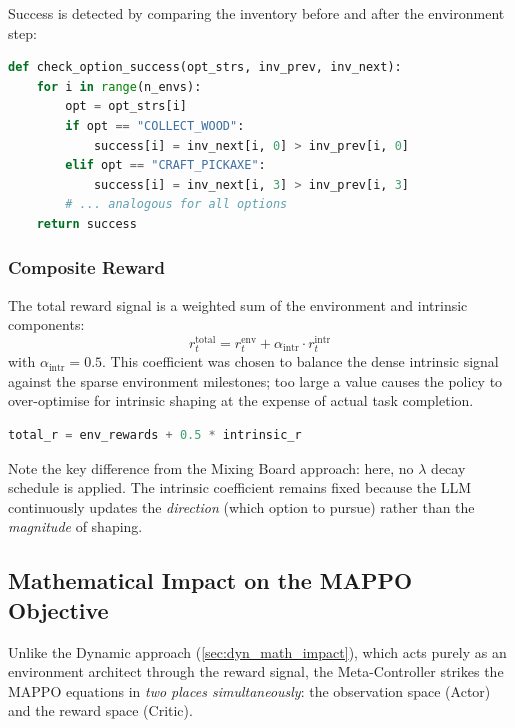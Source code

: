 Success is detected by comparing the inventory before and after the
environment step:
\begin{lstlisting}[style=code, language=Python, caption={Option success detection in \texttt{hrl\_train\_loop.py}.}, label={lst:success_check}]
def check_option_success(opt_strs, inv_prev, inv_next):
    for i in range(n_envs):
        opt = opt_strs[i]
        if opt == "COLLECT_WOOD":
            success[i] = inv_next[i, 0] > inv_prev[i, 0]
        elif opt == "CRAFT_PICKAXE":
            success[i] = inv_next[i, 3] > inv_prev[i, 3]
        # ... analogous for all options
    return success
\end{lstlisting}

\subsubsection{Composite Reward}

The total reward signal is a weighted sum of the environment and
intrinsic components:
\begin{equation}
\label{eq:hrl_total_reward}
\boxed{
    r_t^{\text{total}}
    = r_t^{\text{env}}
    + \alpha_{\text{intr}} \cdot r_t^{\text{intr}}
}
\end{equation}
with $\alpha_{\text{intr}} = 0.5$. This coefficient was chosen to
balance the dense intrinsic signal against the sparse environment
milestones; too large a value causes the policy to over-optimise
for intrinsic shaping at the expense of actual task completion.

\begin{lstlisting}[style=code, language=Python, caption={Composite reward in \texttt{hrl\_train\_loop.py}.}, label={lst:composite_reward}]
total_r = env_rewards + 0.5 * intrinsic_r
\end{lstlisting}

Note the key difference from the Mixing Board approach: here, no
$\lambda$ decay schedule is applied. The intrinsic coefficient
remains fixed because the LLM continuously updates the \emph{direction}
(which option to pursue) rather than the \emph{magnitude} of shaping.

\subsection{Mathematical Impact on the MAPPO Objective}
\label{sec:hrl_math_impact}

Unlike the Dynamic approach (\cref{sec:dyn_math_impact}), which acts purely as an environment architect through the reward signal, the Meta-Controller strikes the MAPPO equations in \emph{two places simultaneously}: the observation space (Actor) and the reward space (Critic).


